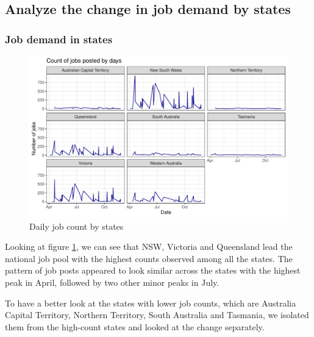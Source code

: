 \documentclass[11pt,a4paper,]{article}
\begin{document}
\hypertarget{analyze-the-change-in-job-demand-by-states}{%
\subsection{Analyze the change in job demand by states}\label{analyze-the-change-in-job-demand-by-states}}

\hypertarget{job-demand-in-states}{%
\subsubsection{Job demand in states}\label{job-demand-in-states}}

\begin{figure}

{\centering \includegraphics{Team_JHDP_Assignment4_files/figure-latex/state-demand-1} 

}

\caption{Daily job count by states}\label{fig:state-demand}
\end{figure}

Looking at figure \ref{fig:state-demand}, we can see that NSW, Victoria and Queensland lead the national job pool with the highest counts observed among all the states. The pattern of job posts appeared to look similar across the states with the highest peak in April, followed by two other minor peaks in July.

To have a better look at the states with lower job counts, which are Australia Capital Territory, Northern Territory, South Australia and Tasmania, we isolated them from the high-count states and looked at the change separately.
\end{document}
